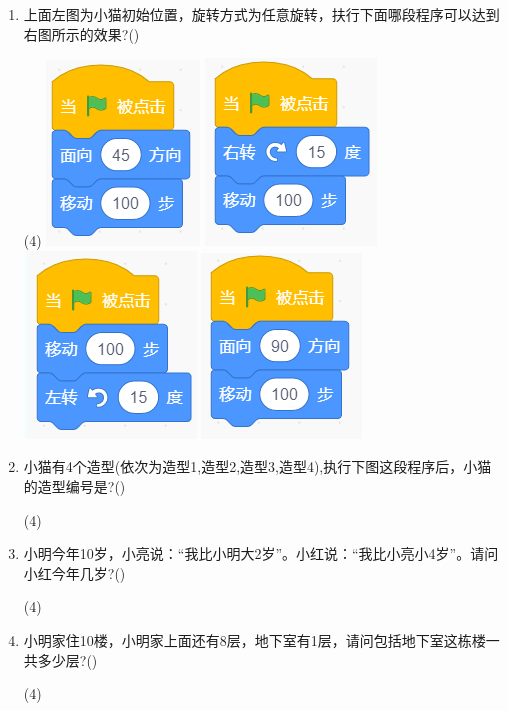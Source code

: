 \documentclass[10pt, a4paper]{article}
\begin{document}
\begin{enumerate}
        \item 上面左图为小猫初始位置，旋转方式为任意旋转，扶行下面哪段程序可以达到右图所示的效果?(\qquad)
        \begin{tasks}(4)
            \task \includegraphics[width=.08\textwidth]{14a.png}
            \task \includegraphics[width=.08\textwidth]{14b.png}
            \task \includegraphics[width=.08\textwidth]{14c.png}
            \task \includegraphics[width=.08\textwidth]{14d.png}
        \end{tasks}
    
        \newpage
        \item 小猫有4个造型(依次为造型1,造型2,造型3,造型4),执行下图这段程序后，小猫的造型编号是?(\qquad)
        \begin{tasks}(4)
        \end{tasks}
        
        \item 小明今年10岁，小亮说：“我比小明大2岁”。小红说：“我比小亮小4岁”。请问小红今年几岁?(\qquad)
        \begin{tasks}(4)
        \end{tasks}

        \item 小明家住10楼，小明家上面还有8层，地下室有1层，请问包括地下室这栋楼一共多少层?(\qquad)
        \begin{tasks}(4)
        \end{tasks}


\end{enumerate}
\end{document}
